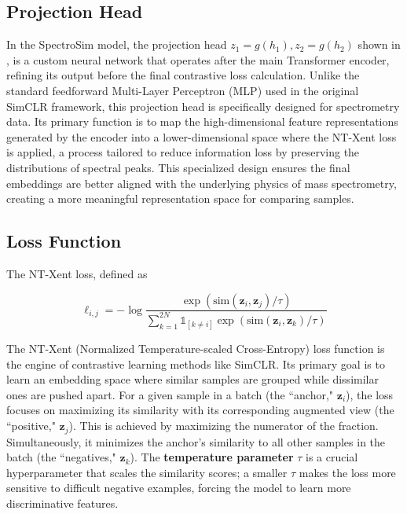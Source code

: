 \subsection{Projection Head}
\label{sec:projection} 

In the SpectroSim model, the projection head $z_1 = g(h_1), z_2 = g(h_2)$ shown in , is a custom neural network that operates after the main Transformer encoder, refining its output before the final contrastive loss calculation. Unlike the standard feedforward Multi-Layer Perceptron (MLP) used in the original SimCLR framework, this projection head is specifically designed for spectrometry data. Its primary function is to map the high-dimensional feature representations generated by the encoder into a lower-dimensional space where the NT-Xent loss is applied, a process tailored to reduce information loss by preserving the distributions of spectral peaks. This specialized design ensures the final embeddings are better aligned with the underlying physics of mass spectrometry, creating a more meaningful representation space for comparing samples.

\subsection{Loss Function}

The NT-Xent loss, defined as

\[
\ell_{i,j} = -\log \frac{\exp(\text{sim}(\mathbf{z}_i, \mathbf{z}_j) / \tau)}
{\sum_{k=1}^{2N} \mathbb{1}_{[k \neq i]} \exp(\text{sim}(\mathbf{z}_i, \mathbf{z}_k) / \tau)}
\]

The NT-Xent (Normalized Temperature-scaled Cross-Entropy) loss function is the engine of contrastive learning methods like SimCLR. Its primary goal is to learn an embedding space where similar samples are grouped while dissimilar ones are pushed apart. For a given sample in a batch (the ``anchor," $\mathbf{z}_i$), the loss focuses on maximizing its similarity with its corresponding augmented view (the ``positive," $\mathbf{z}_j$). This is achieved by maximizing the numerator of the fraction. Simultaneously, it minimizes the anchor's similarity to all other samples in the batch (the ``negatives," $\mathbf{z}_k$). The \textbf{temperature parameter} $\tau$ is a crucial hyperparameter that scales the similarity scores; a smaller $\tau$ makes the loss more sensitive to difficult negative examples, forcing the model to learn more discriminative features.

